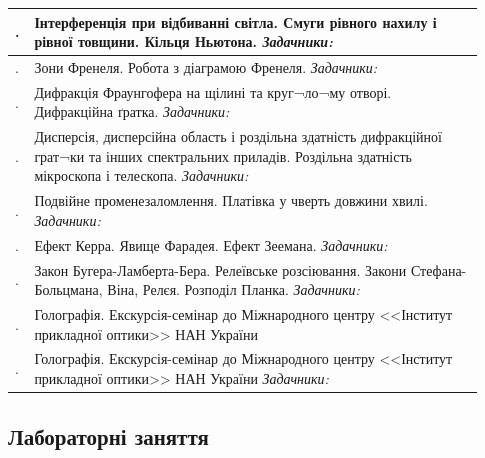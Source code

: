 \documentclass{Syllabus}
\def\probl{\textit{Задачники:\ }}
\begin{document}
\begin{center}
\begin{longtable}{|>{\arraybackslash}m{0.03\linewidth}|>{\raggedright\arraybackslash}m{0.9\linewidth}|}
		\rownumber. & Інтерференція при відбиванні світла. Смуги рівного нахилу і рівної товщини. Кільця Ньютона.
        \newline \probl{}  \cite{ivanova2022optics,Ivanova}
		\\\hline
		\rownumber. &  Зони Френеля. Робота з діаграмою Френеля.
        \newline \probl{}  \cite{ivanova2022optics,Ivanova}
		\\\hline
		\rownumber. & Дифракція Фраунгофера на щілині та круг¬ло¬му отворі. Дифракційна ґратка.
        \newline \probl{}  \cite{ivanova2022optics,Ivanova}
    	\\\hline
		\rownumber. & Дисперсія, дисперсійна область і роздільна здатність дифракційної грат¬ки та інших спектральних приладів. Роздільна здатність мікроскопа і телескопа.
        \newline \probl{}  \cite{Ivanova}
		\\\hline
		\rownumber. & Подвійне променезаломлення. Платівка у чверть довжини хвилі.
        \newline \probl{}  \cite{ivanova2022optics,Ivanova}
		\\\hline
		\rownumber. & Ефект Керра. Явище Фарадея. Ефект Зеемана.
        \newline \probl{}  \cite{ivanova2022optics,Ivanova}
        \\\hline
		\rownumber. & Закон Бугера-Ламберта-Бера. Релеївське розсіювання. Закони Стефана-Больцмана, Віна, Релєя. Розподіл Планка.
        \newline \probl{}   \cite{Ivanova}
		\\\hline
		\rownumber. & Голографія. Екскурсія-семінар до Міжнародного центру <<Інститут прикладної оптики>> НАН України
    
		\\\hline
		\rownumber. & Голографія. Екскурсія-семінар до Міжнародного центру <<Інститут прикладної оптики>> НАН України
        \newline \probl{}  \cite{Ivanova}
		\\\hline
	\end{longtable}
\end{center}

\vspace*{-3em}
\subsection*{Лабораторні заняття}\setcounter{magicrownumbers}{0}
\end{document}
